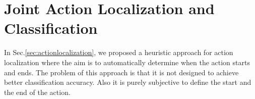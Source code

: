 \documentclass[10pt,twocolumn,letterpaper]{article}
\newcommand{\argmax}{\operatornamewithlimits{argmax}}
\begin{document}
%
%
%
%
%
%



\section{Joint Action Localization and Classification}
In Sec.\ref{sec:actionlocalization}, we proposed a heuristic approach for action localization where the aim is to automatically determine when the action starts and ends. The problem of this approach is that it is not designed to achieve better classification accuracy. Also it is purely subjective to define the start and the end of the action.
\end{document}
